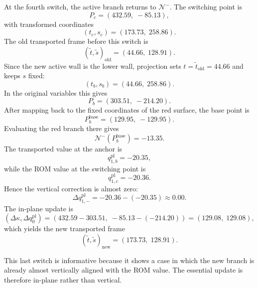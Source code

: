 \documentclass[11pt,a4paper]{article}
\begin{document}
At the fourth switch, the active branch returns to \(\mathcal{N}^{-}\). The switching point is
\begin{equation}
P_c=(432.59,\;-85.13),
\end{equation}
with transformed coordinates
\begin{equation}
(t_c,s_c)=(173.73,\;258.86).
\end{equation}
The old transported frame before this switch is
\begin{equation}
(\tilde t,\tilde s)_{\mathrm{old}}=(44.66,\;128.91).
\end{equation}
Since the new active wall is the lower wall, projection sets \(t=\tilde t_{\mathrm{old}}=44.66\) and keeps \(s\) fixed:
\begin{equation}
(t_b,s_b)=(44.66,\;258.86).
\end{equation}
In the original variables this gives
\begin{equation}
P_b=(303.51,\;-214.20).
\end{equation}
After mapping back to the fixed coordinates of the red surface, the base point is
\begin{equation}
P_b^{\mathrm{base}}=(129.95,\;-129.95).
\end{equation}
Evaluating the red branch there gives
\begin{equation}
\mathcal{N}^{-}(P_b^{\mathrm{base}})=-13.35.
\end{equation}
The transported value at the anchor is
\begin{equation}
q^{\mathrm{pl}}_{1,b}=-20.35,
\end{equation}
while the ROM value at the switching point is
\begin{equation}
q^{\mathrm{pl}}_{1,c}=-20.36.
\end{equation}
Hence the vertical correction is almost zero:
\begin{equation}
\Delta q^{\mathrm{pl}}_{1,-}
=
-20.36-(-20.35)
\approx
0.00.
\end{equation}
The in-plane update is
\begin{equation}
(\Delta \kappa,\Delta q^{\mathrm{pl}}_0)
=
(432.59-303.51,\;-85.13-(-214.20))
=
(129.08,\;129.08),
\end{equation}
which yields the new transported frame
\begin{equation}
(\tilde t,\tilde s)_{\mathrm{new}}=(173.73,\;128.91).
\end{equation}

This last switch is informative because it shows a case in which the new branch is already almost vertically aligned with the ROM value. The essential update is therefore in-plane rather than vertical.
\end{document}
